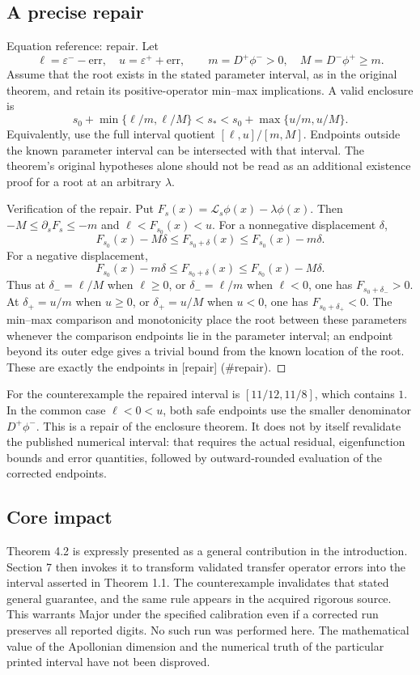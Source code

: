 \documentclass[10pt]{article}
\begin{document}
\subsection*{A precise repair}
Equation reference: repair. Let \[\ell=\varepsilon^--\mathrm{err},\quad u=\varepsilon^++\mathrm{err},\qquad
 m=D^+\phi^->0,\quad M=D^-\phi^+\ge m.\] Assume that the root exists in the stated parameter interval, as in the original theorem, and retain its positive-operator min–max implications. A valid enclosure is \[
 s_0+\min\{\ell/m,\ell/M\}
 <s_*<
 s_0+\max\{u/m,u/M\}.\] Equivalently, use the full interval quotient \([\ell,u]/[m,M]\). Endpoints outside the known parameter interval can be intersected with that interval. The theorem’s original hypotheses alone should not be read as an additional existence proof for a root at an arbitrary \(\lambda\).\par
Verification of the repair. Put \(F_s(x)=\mathcal L_s\phi(x)-\lambda\phi(x)\). Then \(-M\le\partial_sF_s\le-m\) and \(\ell<F_{s_0}(x)<u\). For a nonnegative displacement \(\delta\), \[F_{s_0}(x)-M\delta\le F_{s_0+\delta}(x)
 \le F_{s_0}(x)-m\delta.\] For a negative displacement, \[F_{s_0}(x)-m\delta\le F_{s_0+\delta}(x)
 \le F_{s_0}(x)-M\delta.\] Thus at \(\delta_-=\ell/M\) when \(\ell\ge0\), or \(\delta_-=\ell/m\) when \(\ell<0\), one has \(F_{s_0+\delta_-}>0\). At \(\delta_+=u/m\) when \(u\ge0\), or \(\delta_+=u/M\) when \(u<0\), one has \(F_{s_0+\delta_+}<0\). The min–max comparison and monotonicity place the root between these parameters whenever the comparison endpoints lie in the parameter interval; an endpoint beyond its outer edge gives a trivial bound from the known location of the root. These are exactly the endpoints in [repair] (\#repair). ◻\par
For the counterexample the repaired interval is \([11/12,11/8]\), which contains \(1\). In the common case \(\ell<0<u\), both safe endpoints use the smaller denominator \(D^+\phi^-\). This is a repair of the enclosure theorem. It does not by itself revalidate the published numerical interval: that requires the actual residual, eigenfunction bounds and error quantities, followed by outward-rounded evaluation of the corrected endpoints.\par
\subsection*{Core impact}
Theorem 4.2 is expressly presented as a general contribution in the introduction. Section 7 then invokes it to transform validated transfer operator errors into the interval asserted in Theorem 1.1. The counterexample invalidates that stated general guarantee, and the same rule appears in the acquired rigorous source. This warrants Major under the specified calibration even if a corrected run preserves all reported digits. No such run was performed here. The mathematical value of the Apollonian dimension and the numerical truth of the particular printed interval have not been disproved.\par
\end{document}
